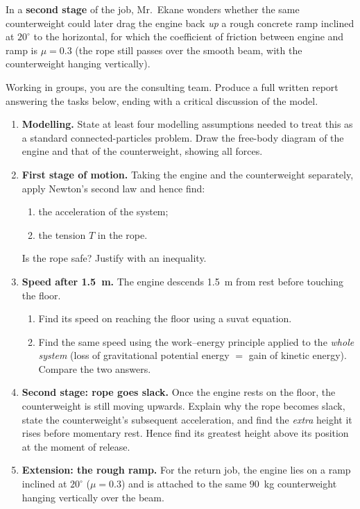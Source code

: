 \documentclass[11pt]{article}
\newcounter{popsec}
\newcounter{popsub}
\newcommand{\courssub}[1]{%
  \stepcounter{popsub}%
  \par\vspace{9pt}\noindent{\popxbold\fontsize{11.5}{13}\selectfont\color{popink}{\color{poporange}\thepopsec.\thepopsub}\hspace{6pt}#1}\par\nopagebreak\vspace{4pt}
}
\begin{document}
In a \textbf{second stage} of the job, Mr.~Ekane wonders whether the same counterweight could later drag the engine back \emph{up} a rough concrete ramp inclined at $20^\circ$ to the horizontal, for which the coefficient of friction between engine and ramp is $\mu = 0.3$ (the rope still passes over the smooth beam, with the counterweight hanging vertically).

Working in groups, you are the consulting team. Produce a full written report answering the tasks below, ending with a critical discussion of the model.

\courssub{Tasks}

\begin{enumerate}
\item \textbf{Modelling.} State at least four modelling assumptions needed to treat this as a standard connected-particles problem. Draw the free-body diagram of the engine and that of the counterweight, showing all forces.
\item \textbf{First stage of motion.} Taking the engine and the counterweight separately, apply Newton's second law and hence find:
\begin{enumerate}
\item the acceleration of the system;
\item the tension $T$ in the rope.
\end{enumerate}
Is the rope safe? Justify with an inequality.
\item \textbf{Speed after \SI{1.5}{m}.} The engine descends \SI{1.5}{m} from rest before touching the floor.
\begin{enumerate}
\item Find its speed on reaching the floor using a suvat equation.
\item Find the same speed using the work--energy principle applied to the \emph{whole system} (loss of gravitational potential energy $=$ gain of kinetic energy). Compare the two answers.
\end{enumerate}
\item \textbf{Second stage: rope goes slack.} Once the engine rests on the floor, the counterweight is still moving upwards. Explain why the rope becomes slack, state the counterweight's subsequent acceleration, and find the \emph{extra} height it rises before momentary rest. Hence find its greatest height above its position at the moment of release.
\item \textbf{Extension: the rough ramp.} For the return job, the engine lies on a ramp inclined at $20^\circ$ ($\mu = 0.3$) and is attached to the same $90$~kg counterweight hanging vertically over the beam.

\end{enumerate}
\end{document}

